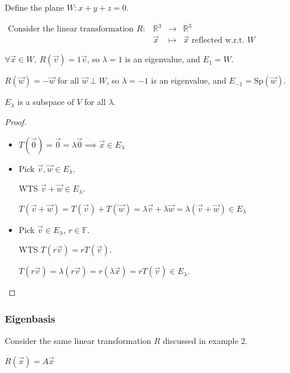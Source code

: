 \documentclass[11pt,fleqn]{book} %
\begin{document}
\begin{example}
    Define the plane $W: x + y + z = 0$.

    $\begin{matrix} \text{Consider the linear transformation }R: &\mathbb{R}^3 &\to &\mathbb{R}^3 \\ &\vec{x} &\mapsto &\vec{x}\text{ reflected w.r.t. }W \end{matrix}$

    $\forall \vec{x} \in W,~R(\vec{v}) = 1\vec{v}$, so $\lambda = 1$ is an eigenvalue, and $E_1 = W$.

    $R(\vec{w}) = -\vec{w}$ for all $\vec{w} \perp W$, so $\lambda = -1$ is an eigenvalue, and $E_{-1} = \mathrm{Sp}(\vec{w})$.
\end{example}


\setcounter{chapter}{4}
\setcounter{dummy}{6}
\begin{proposition}
$E_\lambda$ is a subspace of $V$ for all $\lambda$.
\end{proposition}
\setcounter{chapter}{3}

\begin{proof}
    \begin{itemize}
        \item $T(\vec{0}) = \vec{0} = \lambda\vec{0} \implies \vec{x} \in E_\lambda$

        \item Pick $\vec{v}, \vec{w} \in E_\lambda$.

        WTS $\vec{v} + \vec{w} \in E_\lambda$.

        $T(\vec{v} + \vec{w}) = T(\vec{v}) + T(\vec{w}) = \lambda\vec{v} + \lambda \vec{w} = \lambda(\vec{v} + \vec{w}) \in E_\lambda$

        \item Pick $\vec{v} \in E_\lambda$, $r \in \mathbb{F}$.

        WTS $T(r\vec{v}) = rT(\vec{v})$.

        $T(r\vec{v}) = \lambda(r\vec{v}) = r(\lambda\vec{x}) = rT(\vec{v}) \in E_\lambda$.
    \end{itemize}
\end{proof}

\subsubsection{Eigenbasis}

Consider the same linear transformation $R$ discussed in example 2.

$R(\vec{x}) = A\vec{x}$
\end{document}
